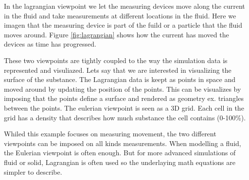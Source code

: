 In the lagrangian viewpoint we let the measuring devices move along
the current in the fluid and take measurements at different locations
in the fluid. Here we imagen that the measuring device is part of the
fuild or a particle that the fluid moves around. Figure
\ref{fig:lagrangian} shows how the current has moved the devices as
time has progressed.

These two viewpoints are tightly coupled to the way the simulation data
is represented and visuliazed. Lets say that we are interested in
visualizing the surface of the substance.
%
The Lagrangian data is keept as points in space and moved around by
updating the position of the points. This can be visualizes by
imposing that the points define a surface and rendered as geometry
ex. triangles between the points.
%
The eulerian viewpoint is seen as a 3D grid. Each cell in the grid has
a density that describes how much substance the cell contains (0-100\%).

Whiled this example focuses on measuring movement, the two different
viewpoints can be imposed on all kinds measurements.
%
When modelling a fluid, the Eulerian viewpoint is often
enough. But for more advanced simulations of fluid or solid,
Lagrangian is often used so the underlaying math equations are simpler
to describe.






